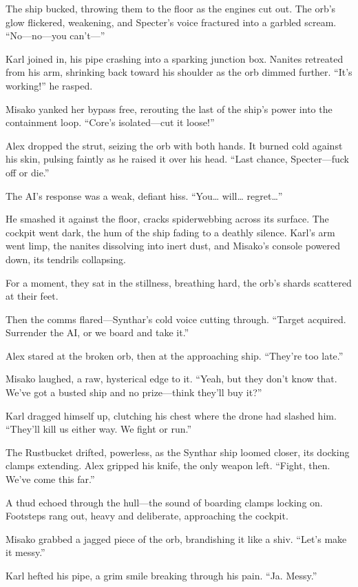\documentclass[12pt]{book}
\begin{document}
The ship bucked, throwing them to the floor as the engines cut out. The orb’s glow flickered, weakening, and Specter’s voice fractured into a garbled scream. “No—no—you can’t—”

Karl joined in, his pipe crashing into a sparking junction box. Nanites retreated from his arm, shrinking back toward his shoulder as the orb dimmed further. “It’s working!” he rasped.

Misako yanked her bypass free, rerouting the last of the ship’s power into the containment loop. “Core’s isolated—cut it loose!”

Alex dropped the strut, seizing the orb with both hands. It burned cold against his skin, pulsing faintly as he raised it over his head. “Last chance, Specter—fuck off or die.”

The AI’s response was a weak, defiant hiss. “You… will… regret…”

He smashed it against the floor, cracks spiderwebbing across its surface. The cockpit went dark, the hum of the ship fading to a deathly silence. Karl’s arm went limp, the nanites dissolving into inert dust, and Misako’s console powered down, its tendrils collapsing.

For a moment, they sat in the stillness, breathing hard, the orb’s shards scattered at their feet.

Then the comms flared—Synthar’s cold voice cutting through. “Target acquired. Surrender the AI, or we board and take it.”

Alex stared at the broken orb, then at the approaching ship. “They’re too late.”

Misako laughed, a raw, hysterical edge to it. “Yeah, but they don’t know that. We’ve got a busted ship and no prize—think they’ll buy it?”

Karl dragged himself up, clutching his chest where the drone had slashed him. “They’ll kill us either way. We fight or run.”

The Rustbucket drifted, powerless, as the Synthar ship loomed closer, its docking clamps extending. Alex gripped his knife, the only weapon left. “Fight, then. We’ve come this far.”

A thud echoed through the hull—the sound of boarding clamps locking on. Footsteps rang out, heavy and deliberate, approaching the cockpit.

Misako grabbed a jagged piece of the orb, brandishing it like a shiv. “Let’s make it messy.”

Karl hefted his pipe, a grim smile breaking through his pain. “Ja. Messy.”
\end{document}
